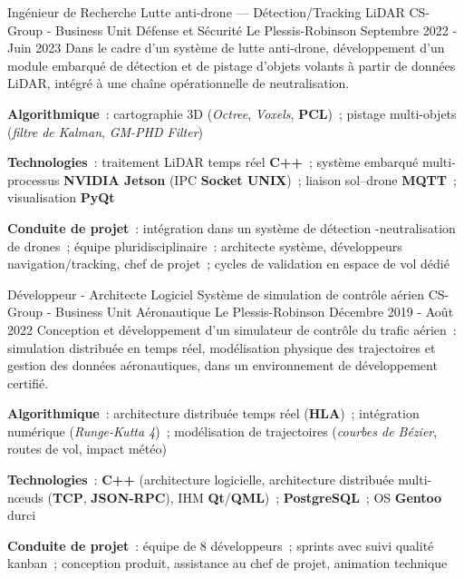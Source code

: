 \begin{cventries}
	\cventry
	{Ingénieur de Recherche}
	{Lutte anti-drone --- Détection\slash Tracking LiDAR}
	{CS-Group - Business Unit Défense et Sécurité} %
	{Le Plessis-Robinson} %
	{Septembre 2022 - Juin 2023} %
	{Dans le cadre d'un système de lutte anti-drone, développement d'un module embarqué de détection et de pistage d'objets volants à partir de données LiDAR, intégré à une chaîne opérationnelle de neutralisation.} %
	{
		\begin{cvitems}
			\item{\textbf{Algorithmique}~: cartographie 3D (\textit{Octree}, \textit{Voxels}, \textbf{PCL})~; pistage multi-objets (\textit{filtre de Kalman}, \textit{GM-PHD Filter})}
			\item{\textbf{Technologies}~: traitement LiDAR temps réel \textbf{C++}~; système embarqué multi-processus \textbf{NVIDIA Jetson} (IPC \textbf{Socket UNIX})~; liaison sol--drone \textbf{MQTT}~; visualisation \textbf{PyQt}}
			\item{\textbf{Conduite de projet}~: intégration dans un système de détection -neutralisation de drones~; équipe pluridisciplinaire~: architecte système, développeurs navigation\slash tracking, chef de projet~; cycles de validation en espace de vol dédié}
		\end{cvitems}
	}

	\cventry
	{Développeur - Architecte Logiciel}
	{Système de simulation de contrôle aérien}
	{CS-Group - Business Unit Aéronautique} %
	{Le Plessis-Robinson} %
	{Décembre 2019 - Août 2022} %
	{Conception et développement d'un simulateur de contrôle du trafic aérien~: simulation distribuée en temps réel, modélisation physique des trajectoires et gestion des données aéronautiques, dans un environnement de développement certifié.} %
	{
		\begin{cvitems}
			\item{\textbf{Algorithmique}~: architecture distribuée temps réel (\textbf{HLA})~; intégration numérique (\textit{Runge-Kutta 4})~; modélisation de trajectoires (\textit{courbes de Bézier}, routes de vol, impact météo)}
			\item{\textbf{Technologies}~: \textbf{C++} (architecture logicielle, architecture distribuée multi-nœuds (\textbf{TCP}, \textbf{JSON-RPC}), IHM \textbf{Qt}\slash\textbf{QML})~; \textbf{PostgreSQL}~; OS \textbf{Gentoo} durci}
			\item{\textbf{Conduite de projet}~: équipe de 8 développeurs~; sprints avec suivi qualité kanban~; conception produit, assistance au chef de projet, animation technique}
		\end{cvitems}
	}


\end{cventries}
